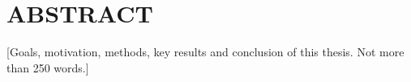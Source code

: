 \chapter*{ABSTRACT}
[Goals, motivation, methods, key results and conclusion of this thesis. Not more than 250 words.]
